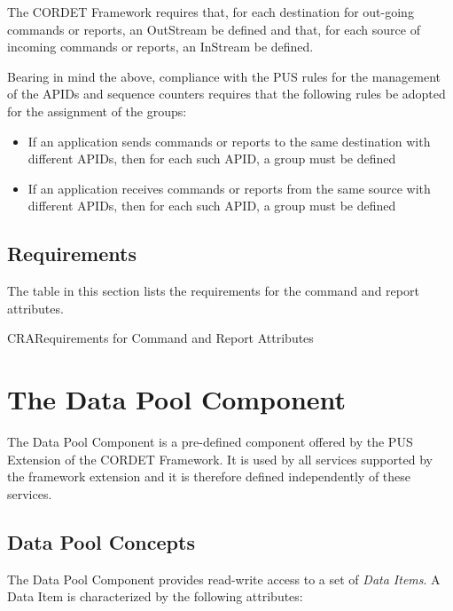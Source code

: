 \documentclass{pnp_article}
\begin{document}
The CORDET Framework requires that, for each destination for out-going commands or reports, an OutStream be defined and that, for each source of incoming commands or reports, an InStream be defined. 

Bearing in mind the above, compliance with the PUS rules for the management of the APIDs and sequence counters requires that the following rules be adopted for the assignment of the groups: 

\begin{itemize}
\item If an application sends commands or reports to the same destination with different APIDs, then for each such APID, a group must be defined
\item If an application receives commands or reports from the same source  with different APIDs, then for each such APID, a group must be defined
\end{itemize}


\newpage
\subsection{Requirements}
The table in this section lists the requirements for the command and report attributes.

\begin{crReq}{CRA}{Requirements for Command and Report Attributes}
\end{crReq}
 

\section{The Data Pool Component}\label{sec:dp}
The Data Pool Component is a pre-defined component offered by the PUS Extension of the CORDET Framework. It is used by all services supported by the framework extension and it is therefore defined independently of these services.

\subsection{Data Pool Concepts}\label{sec:dpConcepts}
The Data Pool Component provides read-write access to a set of \textit{Data Items}. A Data Item is characterized by the following attributes: 
\end{document}
